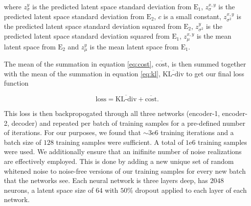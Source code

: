 \documentclass[%
showpacs,
 amsmath,amssymb,
 aps,
 twocolumn,
 prl,
 reprint,
floatfix,
]{revtex4-1}
\begin{document}
where $z^{y}_{\sigma}$ is the predicted latent space standard deviation from $\textrm{E}_1$, 
$z^{x,y}_{\sigma}$ is the predicted latent space standard deviation from $\textrm{E}_2$, 
$c$ is a small constant, $z^{x,y}_{\sigma^{2}}$ is the predicted latent space 
standard deviation squared from $\textrm{E}_2$, $z^{y}_{\sigma^{2}}$ is the predicted 
latent space standard deviation squared from $\textrm{E}_1$, $z^{x,y}_{\mu}$ is the 
mean latent space from $\textrm{E}_2$ and $z^{y}_{\mu}$ is the mean latent space 
from $\textrm{E}_1$.

The mean of the summation in equation \ref{eq:cost}, $\overline{\textrm{cost}}$, 
is then summed together with the mean of the summation in equation \ref{eq:kl}, 
$\overline{\textrm{KL-div}}$ to 
get our final loss function

\begin{equation}
    \textrm{loss} = \overline{\textrm{KL-div}} + \overline{\textrm{cost}}.
\end{equation}

This loss is then backpropogated through all three networks 
(encoder-1, encoder-2, decoder) and repeated per batch of 
training samples for a pre-defined number of iterations. For our 
purposes, we found that $\sim3\textrm{e}6$ training iterations and 
a batch size of $128$ training samples were sufficient. A total 
of $1\textrm{e}6$ training samples were used. We additionally 
ensure that an inifinite number of noise realizations are effectively employed. This 
is done by adding a new unique set of random whitened noise to noise-free 
versions of our training samples for every new batch that the networks 
see. Each neural network is three layers deep, has $2048$ neurons, a latent 
space size of $64$ with $50\%$ dropout applied to each layer of each network.
\end{document}
